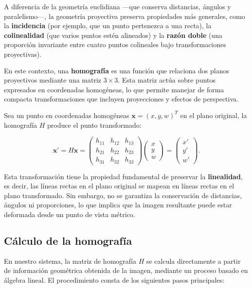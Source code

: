 A diferencia de la geometría euclidiana —que conserva distancias, ángulos y paralelismo—, la geometría proyectiva preserva propiedades más generales, como la \textbf{incidencia} (por ejemplo, que un punto pertenezca a una recta), la \textbf{colinealidad} (que varios puntos estén alineados) y la \textbf{razón doble} (una proporción invariante entre cuatro puntos colineales bajo transformaciones proyectivas).

En este contexto, una \textbf{homografía} es una función que relaciona dos planos proyectivos mediante una matriz \(3 \times 3\). Esta matriz actúa sobre puntos expresados en coordenadas homogéneas, lo que permite manejar de forma compacta transformaciones que incluyen proyecciones y efectos de perspectiva.

Sea un punto en coordenadas homogéneas \(\mathbf{x} = (x, y, w)^T\) en el plano original, la homografía \(H\) produce el punto transformado:

\begin{equation}
\mathbf{x}' = H \mathbf{x} =
\begin{pmatrix}
h_{11} & h_{12} & h_{13} \\
h_{21} & h_{22} & h_{23} \\
h_{31} & h_{32} & h_{33}
\end{pmatrix}
\begin{pmatrix}
x \\ y \\ w
\end{pmatrix}
=
\begin{pmatrix}
x' \\ y' \\ w'
\end{pmatrix}.
\label{eq:homografia}
\end{equation}

Esta transformación tiene la propiedad fundamental de preservar la \textbf{linealidad}, es decir, las líneas rectas en el plano original se mapean en líneas rectas en el plano transformado. Sin embargo, no se garantiza la conservación de distancias, ángulos ni proporciones, lo que implica que la imagen resultante puede estar deformada desde un punto de vista métrico.

\subsection*{Cálculo de la homografía}

En nuestro sistema, la matriz de homografía \(H\) se calcula directamente a partir de información geométrica obtenida de la imagen, mediante un proceso basado en álgebra lineal. El procedimiento consta de los siguientes pasos principales:

